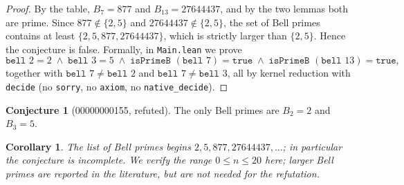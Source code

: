 \documentclass[11pt]{article}
\newtheorem{corollary}[theorem]{Corollary}
\theoremstyle{definition}
\newtheorem{conjecture}[theorem]{Conjecture}
\begin{document}
\begin{proof}
By the table, $B_7 = 877$ and $B_{13} = 27644437$, and by the two lemmas
both are prime. Since $877 \notin \{2, 5\}$ and
$27644437 \notin \{2, 5\}$, the set of Bell primes contains at least
$\{2, 5, 877, 27644437\}$, which is strictly larger than $\{2, 5\}$.
Hence the conjecture is false. Formally, in \texttt{Main.lean} we prove
\[
\texttt{bell } 2 = 2 \;\wedge\; \texttt{bell } 3 = 5 \;\wedge\;
\texttt{isPrimeB }(\texttt{bell } 7) = \texttt{true} \;\wedge\;
\texttt{isPrimeB }(\texttt{bell } 13) = \texttt{true},
\]
together with $\texttt{bell } 7 \ne \texttt{bell } 2$ and
$\texttt{bell } 7 \ne \texttt{bell } 3$, all by kernel reduction with
\texttt{decide} (no \texttt{sorry}, no \texttt{axiom}, no
\texttt{native\_decide}).
\end{proof}

\begin{conjecture}[00000000155, refuted]
The only Bell primes are $B_2 = 2$ and $B_3 = 5$.
\end{conjecture}

\begin{corollary}
The list of Bell primes begins $2, 5, 877, 27644437, \dots$; in particular
the conjecture is incomplete.  We verify the range $0 \le n \le 20$ here;
larger Bell primes are reported in the literature, but are not needed for
the refutation.
\end{corollary}
\end{document}
